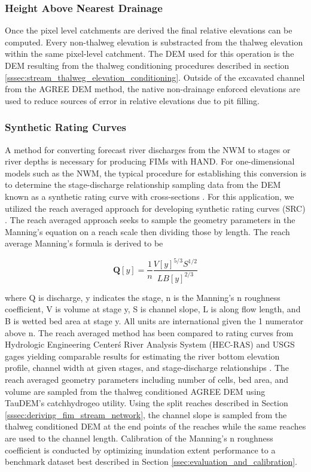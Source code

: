 \subsubsection{Height Above Nearest Drainage}
%
Once the pixel level catchments are derived the final relative elevations can be computed.
Every non-thalweg elevation is substracted from the thalweg elevation within the same pixel-level catchment.
The DEM used for this operation is the DEM resulting from the thalweg conditioning procedures described in section \ref{sssec:stream_thalweg_elevation_conditioning}.
Outside of the excavated channel from the AGREE DEM method, the native non-drainage enforced elevations are used to reduce sources of error in relative elevations due to pit filling. 
%
\subsubsection{Synthetic Rating Curves}
\label{sssec:synthetic_rating_curve}
%
 A method for converting forecast river discharges from the NWM to stages or river depths is necessary for producing FIMs with HAND. 
For one-dimensional models such as the NWM, the typical procedure for establishing this conversion is to determine the stage-discharge relationship sampling data from the DEM known as a synthetic rating curve with cross-sections \cite{quintero2021development,di2011hydraulic}. 
For this application, we utilized the reach averaged approach for developing synthetic rating curves (SRC) \cite{zheng2018river}.
The reach averaged approach seeks to sample the geometry parameters in the Manning's equation \cite{gauckler1867etudes,manning1890flow} on a reach scale then dividing those by length. 
The reach average Manning's formula is derived to be 

\begin{equation}
\label{eq:reach_averaged_mannings_equation}
\textbf{Q}[y] = \frac{1}{n} \frac{V[y]^{5/3}S^{1/2}}{L B[y]^{2/3}} 
\end{equation}

where Q is discharge, y indicates the stage, n is the Manning's n roughness coefficient, V is volume at stage y, S is channel slope, L is along flow length, and B is wetted bed area at stage y.
All units are international given the 1 numerator above n.
The reach averaged method has been compared to rating curves from Hydrologic Engineering Center\'s River Analysis System (HEC-RAS) and USGS gages yielding comparable results for estimating the river bottom elevation profile, channel width at given stages, and stage-discharge relationships \cite{zheng2018river}.
The reach averaged geometry parameters including number of cells, bed area, and volume are sampled from the thalweg conditioned AGREE DEM using TauDEM's catchhydrogeo utility.
Using the split reaches described in Section \ref{sssec:deriving_fim_stream_network}, the channel slope is sampled from the thalweg conditioned DEM at the end points of the reaches while the same reaches are used to the channel length.
Calibration of the Manning's n roughness coefficient is conducted by optimizing inundation extent performance to a benchmark dataset best described in Section \ref{ssec:evaluation_and_calibration}. 
%
